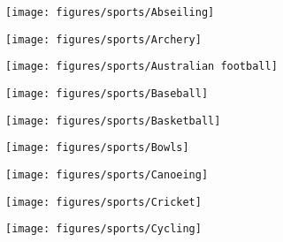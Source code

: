 \documentclass[11pt]{article}
\begin{document}
    

    \begin{figure}[htb!]
        \centering

        \begin{subfigure}{.5\textwidth}
            \centering
            \texttt{[image: figures/sports/Abseiling]}
        \end{subfigure}%
        \hfill
        \begin{subfigure}{.5\textwidth}
            \centering
            \texttt{[image: figures/sports/Archery]}
        \end{subfigure}%
        \hfill
        \begin{subfigure}{.5\textwidth}
            \centering
            \texttt{[image: figures/sports/Australian football]}
        \end{subfigure}%
        \hfill
        \begin{subfigure}{.5\textwidth}
            \centering
            \texttt{[image: figures/sports/Baseball]}
        \end{subfigure}%
        \hfill
        \begin{subfigure}{.5\textwidth}
            \centering
            \texttt{[image: figures/sports/Basketball]}
        \end{subfigure}%
        \hfill
        \begin{subfigure}{.5\textwidth}
            \centering
            \texttt{[image: figures/sports/Bowls]}
        \end{subfigure}%
         \hfill
         \begin{subfigure}{.5\textwidth}
             \centering
             \texttt{[image: figures/sports/Canoeing]}
         \end{subfigure}%
        \hfill
        \begin{subfigure}{.5\textwidth}
            \centering
            \texttt{[image: figures/sports/Cricket]}
        \end{subfigure}%
        \hfill
        \begin{subfigure}{.5\textwidth}
            \centering
            \texttt{[image: figures/sports/Cycling]}
        \end{subfigure}%
    \end{figure}
\end{document}
